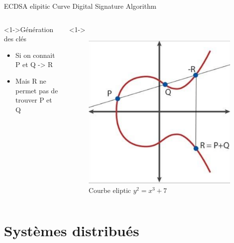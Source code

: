\documentclass[presentation]{beamer}
\begin{document}
\begin{frame}[label={sec:orga02c1d7}]{ECDSA elipitic Curve Digital Signature Algorithm}
\begin{columns}
\begin{column}{0.46\columnwidth}
\begin{block}<1->{Génération des clés}
\begin{itemize}
\item Si on connait P et Q -> R
\item Mais R ne permet pas de trouver P et Q
\end{itemize}
\end{block}
\end{column}

\begin{column}{0.46\columnwidth}
\begin{block}<1->{}
\begin{figure}[htbp]
\centering
\includegraphics[width=.8\textwidth]{Images/eliptic.png}
\caption{Courbe eliptic \(y^2 = x^3 +7\)}
\end{figure}
\end{block}
\end{column}
\end{columns}
\end{frame}



\section{Systèmes distribués}
\label{sec:orgdab6eb7}
\end{document}

